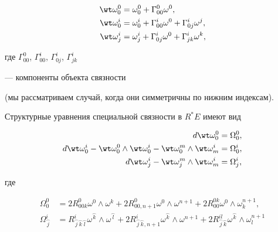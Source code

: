 \begin{align*}


\wt \omega_0^0&=\omega_0^0+\Gamma_{00}^0 \omega^0, \\


\wt \omega_0^i&=\omega_0^i+\Gamma_{00}^i \omega^0+\Gamma_{0j}^i \omega^j, \\


\wt \omega_j^i&=\omega_j^i+\Gamma_{0j}^i \omega^0+\Gamma_{jk}^i \omega^k, 


\end{align*}


где $\Gamma_{00}^0$, $\Gamma_{00}^i$, $\Gamma_{0j}^i$, $\Gamma_{jk}^i$


--- компоненты объекта связности


(мы рассматриваем случай, когда они симметричны по нижним индексам).


Структурные уравнения специальной связности в $R^*E$ имеют вид


\begin{align*}


d\wt \omega_0^0 &= \Omega_0^0, \\


d\wt \omega_0^i-\wt \omega_0^0 \wedge \wt \omega_0^i-\wt \omega_0^m \wedge


\wt \omega_m^i &= \Omega_0^i, \\


d\wt \omega_j^i-\wt \omega_j^m \wedge \wt \omega_m^i &=\Omega_j^i, 


\end{align*} 


где


\begin{align*}


\Omega_0^0&=2R_{00k}^0 \omega^0 \wedge \omega^k+2R_{00,n+1}^0 \omega^0


\wedge \omega^{n+1}+2R_{00}^{0k} \omega^0 \wedge \omega_k^{n+1}, \\


%


\Omega_{\overset{\frown}{j}{}}^i&=


R_{\overset{\frown}{j}{}


\overset{\frown}{k}{}


\overset{\frown}{l}{}}^i


\omega^{\overset{\frown}{k}{}}


\wedge \omega^{\overset{\frown}{l}{}}+


2R_{\overset{\frown}{j}{} \overset{\frown}{k}{},n+1}^i


\omega^{\overset{\frown}{k}{}}


\wedge \omega^{n+1}+2R_{\overset{\frown}{j}{}


\overset{\frown}{k}{}}^{il}


\omega^{\overset{\frown}{k}{}} \wedge \omega_l^{n+1} 


\end{align*}


